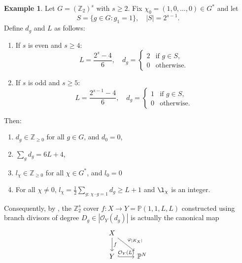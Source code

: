 \documentclass[12pt,twoside,]{amsart}
\theoremstyle{plain}
\theoremstyle{definition}
\newtheorem{example}[theorem]{Example}
\begin{document}
\begin{example}\label{unbounded_non-flat_canonical}
Let $G = (\mathbb{Z}_2)^s$ with $s \ge 2$. Fix $\chi_0 = (1,0,\dots,0) \in G^*$ and let
\[
S = \{ g \in G : g_1 = 1 \}, \quad |S| = 2^{s-1}.
\]
Define $d_g$ and $L$ as follows:

\begin{enumerate}
    \item If $s$ is even and $s \geq 4$:
        \[
        L = \frac{2^s - 4}{6}, \quad d_g = 
        \begin{cases}
        2 & \text{if } g \in S, \\
        0 & \text{otherwise}.
        \end{cases}
        \]
    \item If $s$ is odd and $s \ge 5$:
        \[
        L = \frac{2^{s-1} - 4}{6}, \quad d_g = 
        \begin{cases}
        1 & \text{if } g \in S, \\
        0 & \text{otherwise}.
        \end{cases}
        \]
\end{enumerate}


Then:
\begin{enumerate}
    \item \( d_g \in \mathbb{Z}_{\ge 0} \) for all \( g \in G \), and \( d_0 = 0 \),
    \item $\displaystyle\sum_g d_g = 6L + 4$,
    \item \( l_\chi \in \mathbb{Z}_{\ge 0} \) for all \( \chi \in G^* \), and \( l_0 = 0 \)
    \item For all $\chi \ne 0$, $\displaystyle l_\chi = \frac12 \sum_{g:\, \chi \cdot g = 1} d_g \ge L+1$ and $\l_{\chi}$ is an integer.
\end{enumerate}

Consequently, by , the $\mathbb{Z}_2^s$ cover $f: X \to Y = \mathbb{P}(1,1,L,L)$ constructed using branch divisors of degree $D_g \in |\mathcal{O}_Y(d_g)|$ is actually the canonical map
\[
\begin{tikzcd}
    X \arrow[d, "f"] \arrow[dr, "\varphi_{|K_X|}"] & \\
    Y \arrow[r, hook, "\mathcal{O}_{Y}(L)"] & \mathbb{P}^N
\end{tikzcd}
\]

\end{example}
\end{document}
